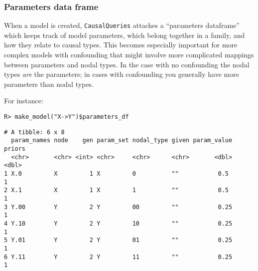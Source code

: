 \documentclass[
  11pt,
  article]{jss}
\begin{document}
\hypertarget{sec-param-df}{%
\subsubsection{Parameters data frame}\label{sec-param-df}}

When a model is created, \texttt{CausalQueries} attaches a ``parameters
dataframe'' which keeps track of model parameters, which belong together
in a family, and how they relate to causal types. This becomes
especially important for more complex models with confounding that might
involve more complicated mappings between parameters and nodal types. In
the case with no confounding the nodal types \emph{are} the parameters;
in cases with confounding you generally have more parameters than nodal
types.

For instance:

\begin{verbatim}
R> make_model("X->Y")$parameters_df
\end{verbatim}

\begin{verbatim}
# A tibble: 6 x 8
  param_names node    gen param_set nodal_type given param_value priors
  <chr>       <chr> <int> <chr>     <chr>      <chr>       <dbl>  <dbl>
1 X.0         X         1 X         0          ""           0.5       1
2 X.1         X         1 X         1          ""           0.5       1
3 Y.00        Y         2 Y         00         ""           0.25      1
4 Y.10        Y         2 Y         10         ""           0.25      1
5 Y.01        Y         2 Y         01         ""           0.25      1
6 Y.11        Y         2 Y         11         ""           0.25      1
\end{verbatim}

\hypertarget{tbl-params-df}{}
\begin{table}
\caption{\label{tbl-params-df}Example of Parameters Data Frame }\tabularnewline

\centering
{}
\end{table}
\end{document}
